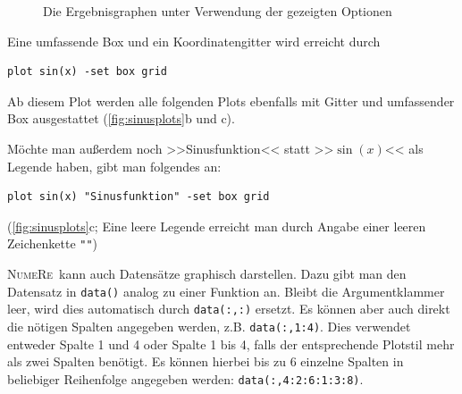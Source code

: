 \documentclass[DIV=14,headsepline,footsepline]{scrbook}
\newcommand{\NR}{\textsc{Nu\-me\-Re}}
\begin{document}
\begin{figure}[p]
					\caption{Die Ergebnisgraphen unter Verwendung der gezeigten Optionen}
					\label{fig:sinusplots}
				\end{figure}
				
				Eine umfassende Box und ein Koordinatengitter wird erreicht durch
				\begin{lstlisting}
plot sin(x) -set box grid
				\end{lstlisting}
				Ab diesem Plot werden alle folgenden Plots ebenfalls mit Gitter und umfassender Box ausgestattet (\autoref{fig:sinusplots}b und c).
				
				Möchte man außerdem noch >>Sinusfunktion<< statt >>$\sin(x)$<< als Legende haben, gibt man folgendes an:
				\begin{lstlisting}
plot sin(x) "Sinusfunktion" -set box grid
				\end{lstlisting}
				(\autoref{fig:sinusplots}c; Eine leere Legende erreicht man durch Angabe einer leeren Zeichenkette \verb+""+)
				
				\NR\ kann auch Datensätze graphisch darstellen. Dazu gibt man den Datensatz in \verb+data()+ analog zu einer Funktion an. Bleibt die Argumentklammer leer, wird dies automatisch durch \verb+data(:,:)+ ersetzt. Es können aber auch direkt die nötigen Spalten angegeben werden, z.B. \verb+data(:,1:4)+. Dies verwendet entweder Spalte 1 und 4 oder Spalte 1 bis 4, falls der entsprechende Plotstil mehr als zwei Spalten benötigt. Es können hierbei bis zu 6 einzelne Spalten in beliebiger Reihenfolge angegeben werden: \verb+data(:,4:2:6:1:3:8)+.
				
\end{document}
